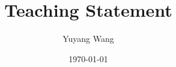 



\title{Teaching Statement}
\def\rsCustom{%
    \kant[6]\cite{wangScalableArchitectureSubpJ2023}
}

\author{Yuyang Wang}
\date{\today}
\makeatletter
\fancyfoot[L]{\scshape \MakeLowercase{\@author}}
\fancyfoot[R]{{\scshape \MakeLowercase{\@title}}\quad{\fontsize{16}{20}\selectfont\sfrac{\thepage}{\pageref*{LastPage}}}\hspace{0.25in}}
\makeatother



\maketitle%


\rsCustom{}

\footnotesize


